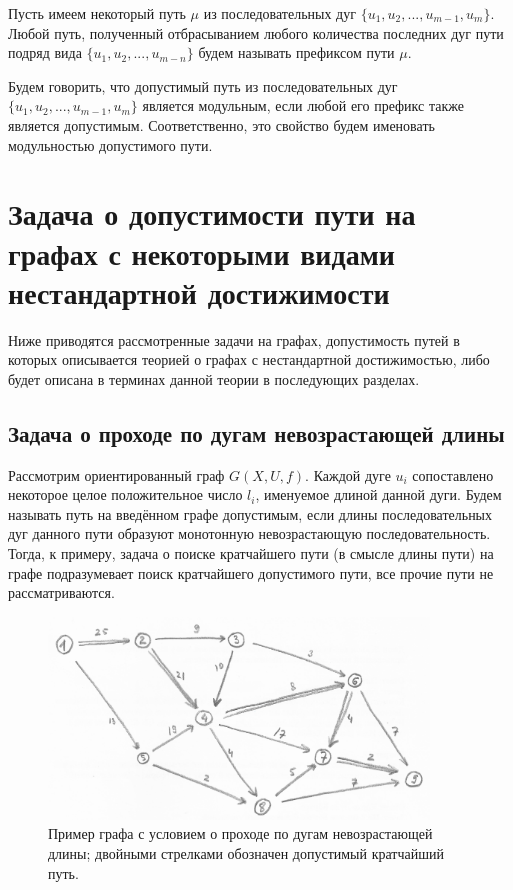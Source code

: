 \begin{definition}
	Пусть имеем некоторый путь $\mu$ из последовательных дуг $\{u_1, u_2, ... , u_{m-1}, u_m\}$. Любой путь, полученный отбрасыванием любого количества последних дуг пути подряд вида $\{u_1, u_2, ... , u_{m-n} \}$ будем называть префиксом пути $\mu$.
\end{definition}

\begin{definition}
	Будем говорить, что допустимый путь из последовательных дуг $\{u_1, u_2, ... , u_{m-1}, u_m\}$ является модульным, если любой его префикс также является допустимым. Соответственно, это свойство будем именовать модульностью допустимого пути. 
\end{definition}

\section{Задача о допустимости пути на графах с некоторыми видами нестандартной достижимости}

Ниже приводятся рассмотренные задачи на графах, допустимость путей в которых описывается теорией о графах с нестандартной достижимостью, либо будет описана в терминах данной теории в последующих разделах. 

\subsection{Задача о проходе по дугам невозрастающей длины}

Рассмотрим ориентированный граф $G(X,U,f)$. Каждой дуге $u_i$ сопоставлено некоторое целое положительное число $l_i$, именуемое длиной данной дуги. Будем называть путь на введённом графе допустимым, если длины последовательных дуг данного пути образуют монотонную невозрастающую последовательность. Тогда, к примеру, задача о поиске кратчайшего пути (в смысле длины пути) на графе подразумевает поиск кратчайшего допустимого пути, все прочие пути не рассматриваются. 

\begin{figure}
	\centering	
	{\includegraphics[width=0.9\textwidth]{img/1.png}}
	{Пример графа с условием о проходе по дугам невозрастающей длины; двойными стрелками обозначен допустимый кратчайший путь.}
	\label{fig:pic_1}
\end{figure}

